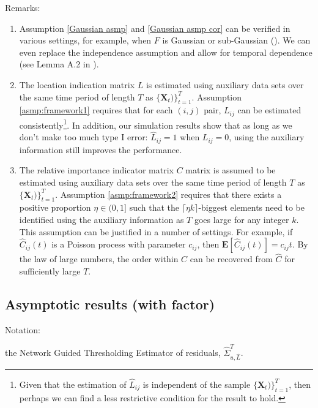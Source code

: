\vspace{5mm}
Remarks: 
\begin{enumerate}
    \item Assumption \autoref{Gaussian asmp} and \autoref{Gaussian asmp cor} can be verified in various settings, for example, when \(F\) is Gaussian or sub-Gaussian (\cite{cai2011adaptive}). We can even replace the independence assumption and allow for temporal dependence (see Lemma A.2 in \cite{shu2019EstimationLarge}). 
    
    \item The location indication matrix $L$ is estimated using auxiliary data sets over the same time period of length $T$ as $\{\boldsymbol{X}_{t})\}_{t=1}^T$. Assumption \autoref{asmp:framework1} requires that for each \((i,j)\) pair, \(L_{ij}\) can be estimated consistently\footnote{Given that the estimation of \(\hat{L}_{ij}\) is independent of the sample \(\{\boldsymbol{X}_{t})\}_{t=1}^T\), then perhaps we can find a less restrictive condition for the result to hold.}.  In addition, our simulation results show that as long as we don't make too much type I error: \(\hat{L}_{ij} = 1\) when \(L_{ij} = 0\), using the auxiliary information still improves the performance.  
    
    \item The relative importance indicator matrix $C$ matrix is assumed to be estimated using auxiliary data sets over the same time period of length $T$ as $\{\boldsymbol{X}_{t})\}_{t=1}^T$. Assumption \autoref{asmp:framework2} requires that there exists a positive proportion $\eta \in (0, 1]$ such that the $\lceil \eta k \rceil$-biggest elements need to be identified using the auxiliary information as $T$ goes large for any integer $k$. This assumption can be justified in a number of settings. For example, if $\hat{C}_{ij}(t)$ is a Poisson process with parameter $c_{ij}$, then $\mathbf{E} [\hat{C}_{ij}(t)] = c_{ij}t$. By the law of large numbers, the order within $C$ can be recovered from $\hat C$ for sufficiently large $T$.
\end{enumerate}

\subsection{Asymptotic results (with factor)}
Notation: 

the Network Guided Thresholding Estimator of residuals, $\hat \Sigma_{u,\hat L}^T$.


